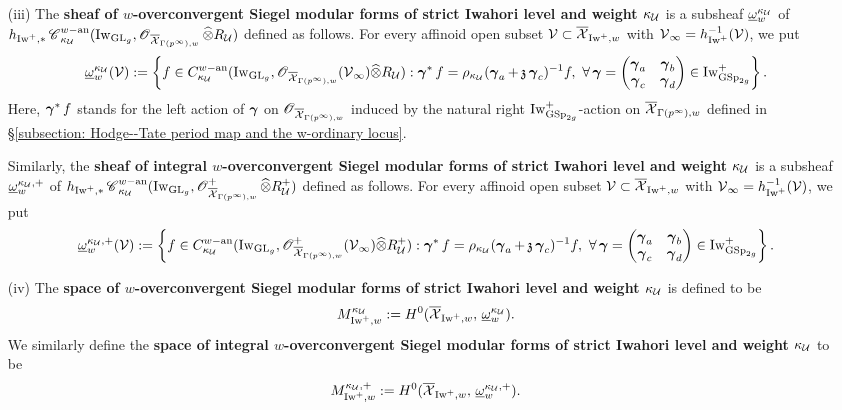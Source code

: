 \begin{Definition}
\begin{enumerate}
\item[(iii)] The \textbf{sheaf of $w$-overconvergent Siegel modular forms of strict Iwahori level and weight $\kappa_{\calU}$} is a subsheaf $\underline{\omega}_w^{\kappa_{\calU}}$ of $h_{\Iw^+, *}\scrC^{w-\an}_{\kappa_{\calU}}(\Iw_{\GL_g}, \scrO_{\overline{\calX}_{\Gamma(p^{\infty}), w}}\widehat{\otimes}R_{\calU})$ defined as follows. For every affinoid open subset $\calV\subset \overline{\calX}_{\Iw^+, w}$ with $\calV_{\infty} = h_{\Iw^+}^{-1}(\calV)$, we put $$\underline{\omega}_w^{\kappa_{\calU}}(\calV):=\left\{f\in C^{w-\an}_{\kappa_{\calU}}(\Iw_{\GL_g}, \scrO_{\overline{\calX}_{\Gamma(p^{\infty}), w}}(\calV_{\infty})\widehat{\otimes}R_{\calU}): \bfgamma^*f=\rho_{\kappa_{\calU}}(\bfgamma_a+\frakz\bfgamma_c)^{-1} f,\,\,\forall \bfgamma=\begin{pmatrix}\bfgamma_a & \bfgamma_b\\ \bfgamma_c & \bfgamma_d\end{pmatrix}\in \Iw_{\GSp_{2g}}^+\right\}.$$ 
Here, $\bfgamma^*f$ stands for the left action of $\bfgamma$ on $\scrO_{\overline{\calX}_{\Gamma(p^{\infty}), w}}$ induced by the natural right $\Iw_{\GSp_{2g}}^+$-action on $\overline{\calX}_{\Gamma(p^{\infty}), w}$ defined in \S \ref{subsection: Hodge--Tate period map and the w-ordinary locus}. 
    
Similarly, the \textbf{sheaf of integral $w$-overconvergent Siegel modular forms of strict Iwahori level and weight $\kappa_{\calU}$} is a subsheaf $\underline{\omega}_w^{\kappa_{\calU},+}$ of $h_{\Iw^+, *}\scrC^{w-\an}_{\kappa_{\calU}}(\Iw_{\GL_g}, \scrO^+_{\overline{\calX}_{\Gamma(p^{\infty}), w}}\widehat{\otimes}R^+_{\calU})$ defined as follows. For every affinoid open subset $\calV\subset \overline{\calX}_{\Iw^+, w}$ with $\calV_{\infty} = h_{\Iw^+}^{-1}(\calV)$, we put $$\underline{\omega}_w^{\kappa_{\calU},+}(\calV):=\left\{f\in C^{w-\an}_{\kappa_{\calU}}(\Iw_{\GL_g}, \scrO^+_{\overline{\calX}_{\Gamma(p^{\infty}), w}}(\calV_{\infty})\widehat{\otimes}R^+_{\calU}): \bfgamma^*f=\rho_{\kappa_{\calU}}(\bfgamma_a+\frakz\bfgamma_c)^{-1} f,\,\,\forall \bfgamma=\begin{pmatrix}\bfgamma_a & \bfgamma_b\\ \bfgamma_c & \bfgamma_d\end{pmatrix}\in \Iw_{\GSp_{2g}}^+\right\}.$$

\item[(iv)] The \textbf{space of $w$-overconvergent Siegel modular forms of strict Iwahori level and weight $\kappa_{\calU}$} is defined to be $$M_{\Iw^+, w}^{\kappa_{\calU}}:=H^0(\overline{\calX}_{\Iw^+, w},\, \underline{\omega}_w^{\kappa_{\calU}}).$$ We similarly define the \textbf{space of integral $w$-overconvergent Siegel modular forms of strict Iwahori level and weight $\kappa_{\calU}$} to be $$M_{\Iw^+, w}^{\kappa_{\calU},+}:=H^0(\overline{\calX}_{\Iw^+, w}, \,\underline{\omega}_w^{\kappa_{\calU}, +}).$$
    

\end{enumerate}
\end{Definition}
